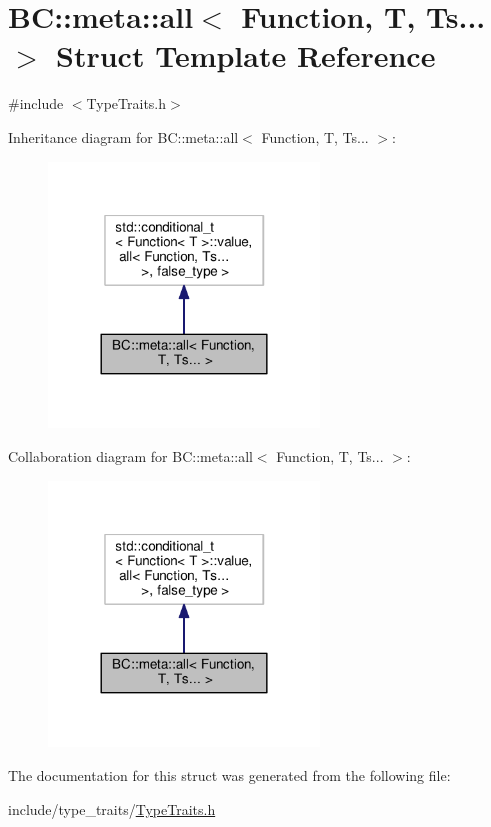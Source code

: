 \hypertarget{structBC_1_1meta_1_1all_3_01Function_00_01T_00_01Ts_8_8_8_01_4}{}\section{BC\+:\+:meta\+:\+:all$<$ Function, T, Ts... $>$ Struct Template Reference}
\label{structBC_1_1meta_1_1all_3_01Function_00_01T_00_01Ts_8_8_8_01_4}


{\ttfamily \#include $<$Type\+Traits.\+h$>$}



Inheritance diagram for BC\+:\+:meta\+:\+:all$<$ Function, T, Ts... $>$\+:
\nopagebreak
\begin{figure}[H]
\begin{center}
\leavevmode
\includegraphics[width=204pt]{structBC_1_1meta_1_1all_3_01Function_00_01T_00_01Ts_8_8_8_01_4__inherit__graph}
\end{center}
\end{figure}


Collaboration diagram for BC\+:\+:meta\+:\+:all$<$ Function, T, Ts... $>$\+:
\nopagebreak
\begin{figure}[H]
\begin{center}
\leavevmode
\includegraphics[width=204pt]{structBC_1_1meta_1_1all_3_01Function_00_01T_00_01Ts_8_8_8_01_4__coll__graph}
\end{center}
\end{figure}


The documentation for this struct was generated from the following file\+:\begin{DoxyCompactItemize}
\item 
include/type\+\_\+traits/\hyperlink{TypeTraits_8h}{Type\+Traits.\+h}\end{DoxyCompactItemize}
